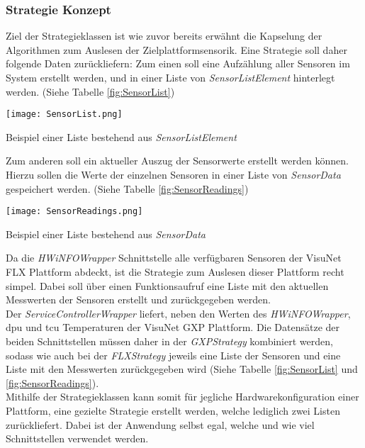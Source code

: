 \subsubsection*{Strategie Konzept}
Ziel der Strategieklassen ist wie zuvor bereits erwähnt die Kapselung der Algorithmen zum Auslesen der Zielplattformsensorik. Eine Strategie soll daher folgende Daten zurückliefern: Zum einen soll eine Aufzählung aller Sensoren im System erstellt werden, und in einer Liste von \textit{SensorListElement} hinterlegt werden. (Siehe Tabelle \ref{fig:SensorList}) 
\vspace{-0.5cm}
\begin{center}
    \begin{table}[h!]
        \centering
        \texttt{[image: SensorList.png]}
        \caption{Beispiel einer Liste bestehend aus \textit{SensorListElement}}
        \label{fig:SensorList}
    \end{table}
\end{center}
\vspace{-1.8cm}
Zum anderen soll ein aktueller Auszug der Sensorwerte erstellt werden können. Hierzu sollen die Werte der einzelnen Sensoren in einer Liste von \textit{SensorData} gespeichert werden. (Siehe Tabelle \ref{fig:SensorReadings})
\vspace{-0.5cm}
\begin{center}
    \begin{table}[h!]
        \centering
        \texttt{[image: SensorReadings.png]}
        \caption{Beispiel einer Liste bestehend aus \textit{SensorData}}
        \label{fig:SensorReadings}
    \end{table}
\end{center}
\vspace{-1.8cm}
Da die \textit{HWiNFOWrapper} Schnittstelle alle verfügbaren Sensoren der VisuNet FLX Plattform abdeckt, ist die Strategie zum Auslesen dieser Plattform recht simpel. Dabei soll über einen Funktionsaufruf eine Liste mit den aktuellen Messwerten der Sensoren erstellt und zurückgegeben werden.\\
Der \textit{ServiceControllerWrapper} liefert, neben den Werten des \textit{HWiNFOWrapper}, \ac{dpu} und \ac{tcu} Temperaturen der VisuNet GXP Plattform. Die Datensätze der beiden Schnittstellen müssen daher in der \textit{GXPStrategy} kombiniert werden, sodass wie auch bei der \textit{FLXStrategy} jeweils eine Liste der Sensoren und eine Liste mit den Messwerten zurückgegeben wird (Siehe Tabelle \ref{fig:SensorList} und \ref{fig:SensorReadings}).\\
Mithilfe der Strategieklassen kann somit für jegliche Hardwarekonfiguration einer Plattform, eine gezielte Strategie erstellt werden, welche lediglich zwei Listen zurückliefert. Dabei ist der Anwendung selbst egal, welche und wie viel Schnittstellen verwendet werden.

